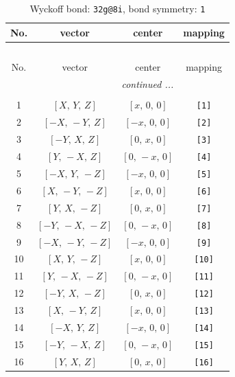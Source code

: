 \documentclass[fleqn,8pt]{jsarticle}
\begin{document}
\begin{longtable}{cccc}
\caption{Wyckoff bond: {\tt 32g@8i}, bond symmetry: {\tt 1}}
 \\
 \hline \hline
No. & vector & center & mapping \\ \hline \endfirsthead

\multicolumn{3}{l}{\tablename\ \thetable{}} \\
 \hline \hline
No. & vector & center & mapping \\ \hline \endhead

 \hline \hline
\multicolumn{3}{r}{\footnotesize\it continued ...} \\ \endfoot

 \hline \hline
\multicolumn{3}{r}{} \\ \endlastfoot

1 & $\left[ X,\, Y,\, Z \right]$ & $\left[ x,\, 0,\, 0 \right]$ & {\tt [1]} \\ \hline
2 & $\left[ - X,\, - Y,\, Z \right]$ & $\left[ - x,\, 0,\, 0 \right]$ & {\tt [2]} \\ \hline
3 & $\left[ - Y,\, X,\, Z \right]$ & $\left[ 0,\, x,\, 0 \right]$ & {\tt [3]} \\ \hline
4 & $\left[ Y,\, - X,\, Z \right]$ & $\left[ 0,\, - x,\, 0 \right]$ & {\tt [4]} \\ \hline
5 & $\left[ - X,\, Y,\, - Z \right]$ & $\left[ - x,\, 0,\, 0 \right]$ & {\tt [5]} \\ \hline
6 & $\left[ X,\, - Y,\, - Z \right]$ & $\left[ x,\, 0,\, 0 \right]$ & {\tt [6]} \\ \hline
7 & $\left[ Y,\, X,\, - Z \right]$ & $\left[ 0,\, x,\, 0 \right]$ & {\tt [7]} \\ \hline
8 & $\left[ - Y,\, - X,\, - Z \right]$ & $\left[ 0,\, - x,\, 0 \right]$ & {\tt [8]} \\ \hline
9 & $\left[ - X,\, - Y,\, - Z \right]$ & $\left[ - x,\, 0,\, 0 \right]$ & {\tt [9]} \\ \hline
10 & $\left[ X,\, Y,\, - Z \right]$ & $\left[ x,\, 0,\, 0 \right]$ & {\tt [10]} \\ \hline
11 & $\left[ Y,\, - X,\, - Z \right]$ & $\left[ 0,\, - x,\, 0 \right]$ & {\tt [11]} \\ \hline
12 & $\left[ - Y,\, X,\, - Z \right]$ & $\left[ 0,\, x,\, 0 \right]$ & {\tt [12]} \\ \hline
13 & $\left[ X,\, - Y,\, Z \right]$ & $\left[ x,\, 0,\, 0 \right]$ & {\tt [13]} \\ \hline
14 & $\left[ - X,\, Y,\, Z \right]$ & $\left[ - x,\, 0,\, 0 \right]$ & {\tt [14]} \\ \hline
15 & $\left[ - Y,\, - X,\, Z \right]$ & $\left[ 0,\, - x,\, 0 \right]$ & {\tt [15]} \\ \hline
16 & $\left[ Y,\, X,\, Z \right]$ & $\left[ 0,\, x,\, 0 \right]$ & {\tt [16]} \\
\end{longtable}
\end{document}
